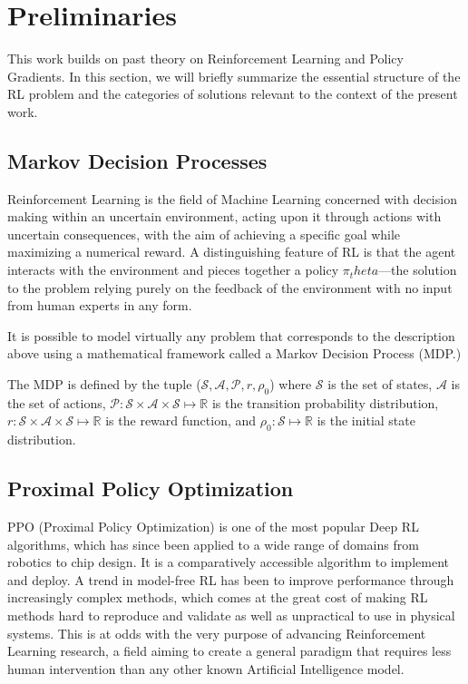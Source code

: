 \section{Preliminaries}
\label{sec:prelim}
This work builds on past theory on Reinforcement Learning and Policy Gradients. In this section, we will briefly summarize the essential structure of the RL problem and the categories of solutions relevant to the context of the present work.

\subsection{Markov Decision Processes}

Reinforcement Learning is the field of Machine Learning concerned with decision making within an uncertain environment, acting upon it through actions with uncertain consequences, with the aim of achieving a specific goal while maximizing a numerical reward. A distinguishing feature of RL is that the agent interacts with the environment and pieces together a policy $\pi_theta$—the solution to the problem relying purely on the feedback of the environment with no input from human experts in any form. 

It is possible to model virtually any problem that corresponds to the description above using a mathematical framework called a Markov Decision Process (MDP.) 

The MDP is defined by the tuple ($\mathcal{S}, \mathcal{A}, \mathcal{P}, r, \rho_0$) where $\mathcal{S}$ is the set of states, $\mathcal{A}$ is the set of actions, $\mathcal{P}: \mathcal{S}\times\mathcal{A}\times\mathcal{S}\mapsto \mathbb{R}$ is the transition probability distribution, $r: \mathcal{S}\times\mathcal{A}\times\mathcal{S} \mapsto \mathbb{R}$ is the reward function, and $\rho_0:\mathcal{S}\mapsto\mathbb{R}$ is the initial state distribution.


\subsection{Proximal Policy Optimization}

PPO (Proximal Policy Optimization\cite{schulman2017proximal}) is one of the most popular Deep RL algorithms, which has since been applied to a wide range of domains from robotics\cite{andrychowicz2020learning} to chip design\cite{mirhoseini2021graph}. It is a comparatively accessible algorithm to implement and deploy. A trend in model-free RL has been to improve performance through increasingly complex methods, which comes at the great cost of making RL methods hard to reproduce and validate as well as unpractical to use in physical systems. This is at odds with the very purpose of advancing Reinforcement Learning research, a field aiming to create a general paradigm that requires less human intervention than any other known Artificial Intelligence model. 
